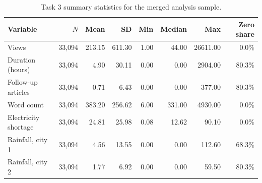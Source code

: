 \begin{table}[htbp]
\centering
\caption{Task 3 summary statistics for the merged analysis sample.}
\label{tab:task3-summary}
\small
\begin{tabular}{lrrrrrrr}
\toprule
Variable & $N$ & Mean & SD & Min & Median & Max & Zero share \\
\midrule
Views & 33,094 & 213.15 & 611.30 & 1.00 & 44.00 & 26611.00 & 0.0\% \\
Duration (hours) & 33,094 & 4.90 & 30.11 & 0.00 & 0.00 & 2904.00 & 80.3\% \\
Follow-up articles & 33,094 & 0.71 & 6.43 & 0.00 & 0.00 & 377.00 & 80.3\% \\
Word count & 33,094 & 383.20 & 256.62 & 6.00 & 331.00 & 4930.00 & 0.0\% \\
Electricity shortage & 33,094 & 24.81 & 25.98 & 0.08 & 12.62 & 90.10 & 0.0\% \\
Rainfall, city 1 & 33,094 & 4.56 & 13.55 & 0.00 & 0.00 & 112.60 & 68.3\% \\
Rainfall, city 2 & 33,094 & 1.77 & 6.92 & 0.00 & 0.00 & 59.50 & 80.3\% \\
\bottomrule
\end{tabular}
\end{table}
